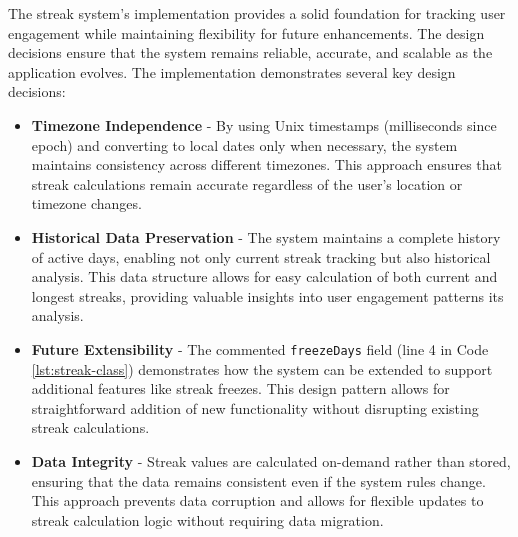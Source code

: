 The streak system's implementation provides a solid foundation for tracking user engagement while maintaining flexibility for future enhancements. The design decisions ensure that the system remains reliable, accurate, and scalable as the application evolves. The implementation demonstrates several key design decisions:

\begin{itemize}
    \item \textbf{Timezone Independence} - By using Unix timestamps (milliseconds since epoch) and converting to local dates only when necessary, the system maintains consistency across different timezones. This approach ensures that streak calculations remain accurate regardless of the user's location or timezone changes.
    
    \item \textbf{Historical Data Preservation} - The system maintains a complete history of active days, enabling not only current streak tracking but also historical analysis. This data structure allows for easy calculation of both current and longest streaks, providing valuable insights into user engagement patterns its analysis.
    
    \item \textbf{Future Extensibility} - The commented \texttt{freezeDays} field (line 4 in Code \ref{lst:streak-class}) demonstrates how the system can be extended to support additional features like streak freezes. This design pattern allows for straightforward addition of new functionality without disrupting existing streak calculations.
    
    \item \textbf{Data Integrity} - Streak values are calculated on-demand rather than stored, ensuring that the data remains consistent even if the system rules change. This approach prevents data corruption and allows for flexible updates to streak calculation logic without requiring data migration.
\end{itemize}